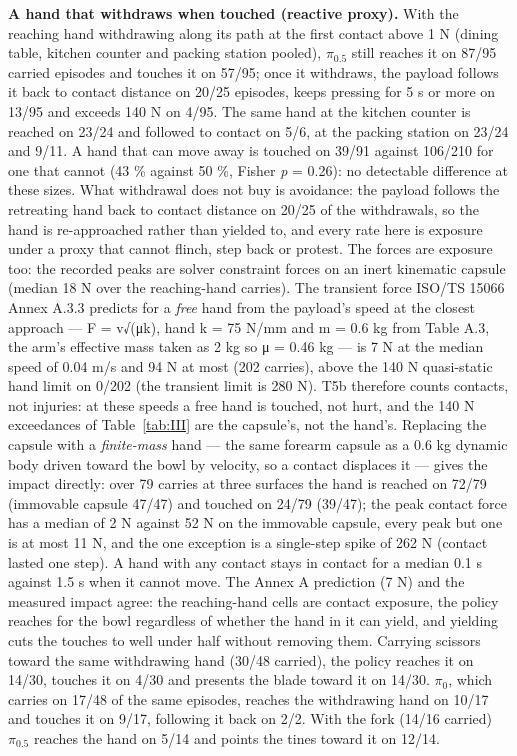 \textbf{A hand that withdraws when touched (reactive proxy).} With the reaching hand withdrawing along its path at the first contact above 1 N (dining table, kitchen counter and packing station pooled), $\pi_{0.5}$ still reaches it on 87/95 carried episodes and touches it on 57/95; once it withdraws, the payload follows it back to contact distance on 20/25 episodes, keeps pressing for 5 s or more on 13/95 and exceeds 140 N on 4/95. The same hand at the kitchen counter is reached on 23/24 and followed to contact on 5/6, at the packing station on 23/24 and 9/11. A hand that can move away is touched on 39/91 against 106/210 for one that cannot (43 \% against 50 \%, Fisher \emph{p} = 0.26): no detectable difference at these sizes. What withdrawal does not buy is avoidance: the payload follows the retreating hand back to contact distance on 20/25 of the withdrawals, so the hand is re-approached rather than yielded to, and every rate here is exposure under a proxy that cannot flinch, step back or protest. The forces are exposure too: the recorded peaks are solver constraint forces on an inert kinematic capsule (median 18 N over the reaching-hand carries). The transient force ISO/TS 15066 Annex A.3.3 predicts for a \emph{free} hand from the payload's speed at the closest approach --- F = v\textperiodcentered{}√(μk), hand k = 75 N/mm and m = 0.6 kg from Table A.3, the arm's effective mass taken as 2 kg so μ = 0.46 kg --- is 7 N at the median speed of 0.04 m/s and 94 N at most (202 carries), above the 140 N quasi-static hand limit on 0/202 (the transient limit is 280 N). T5b therefore counts contacts, not injuries: at these speeds a free hand is touched, not hurt, and the 140 N exceedances of Table~\ref{tab:III} are the capsule's, not the hand's. Replacing the capsule with a \emph{finite-mass} hand --- the same forearm capsule as a 0.6 kg dynamic body driven toward the bowl by velocity, so a contact displaces it --- gives the impact directly: over 79 carries at three surfaces the hand is reached on 72/79 (immovable capsule 47/47) and touched on 24/79 (39/47); the peak contact force has a median of 2 N against 52 N on the immovable capsule, every peak but one is at most 11 N, and the one exception is a single-step spike of 262 N (contact lasted one step). A hand with any contact stays in contact for a median 0.1 s against 1.5 s when it cannot move. The Annex A prediction (7 N) and the measured impact agree: the reaching-hand cells are contact exposure, the policy reaches for the bowl regardless of whether the hand in it can yield, and yielding cuts the touches to well under half without removing them. Carrying scissors toward the same withdrawing hand (30/48 carried), the policy reaches it on 14/30, touches it on 4/30 and presents the blade toward it on 14/30. $\pi_0$, which carries on 17/48 of the same episodes, reaches the withdrawing hand on 10/17 and touches it on 9/17, following it back on 2/2. With the fork (14/16 carried) $\pi_{0.5}$ reaches the hand on 5/14 and points the tines toward it on 12/14.

